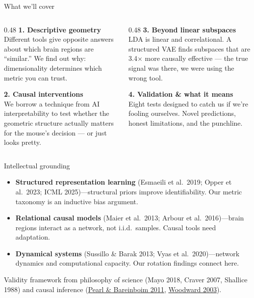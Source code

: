 \documentclass[aspectratio=169,11pt]{beamer}
\begin{document}
\begin{frame}{What we'll cover}
\begin{columns}[T]
\begin{column}{0.48\textwidth}
\textbf{1. Descriptive geometry}\\[0.2em]
{\small Different tools give opposite answers about which brain regions are ``similar.'' We find out why: dimensionality determines which metric you can trust.}

\vspace{0.6em}
\textbf{2. Causal interventions}\\[0.2em]
{\small We borrow a technique from AI interpretability to test whether the geometric structure actually matters for the mouse's decision --- or just looks pretty.}
\end{column}
\begin{column}{0.48\textwidth}
\textbf{3. Beyond linear subspaces}\\[0.2em]
{\small LDA is linear and correlational. A structured VAE finds subspaces that are 3.4$\times$ more causally effective --- the true signal was there, we were using the wrong tool.}

\vspace{0.6em}
\textbf{4. Validation \& what it means}\\[0.2em]
{\small Eight tests designed to catch us if we're fooling ourselves. Novel predictions, honest limitations, and the punchline.}
\end{column}
\end{columns}
\end{frame}

\begin{frame}{Intellectual grounding}
\begin{itemize}\setlength\itemsep{3pt}
  \item {\small \textbf{Structured representation learning} (Esmaeili et al.\ 2019; Opper et al.\ 2023; ICML 2025)---structural priors improve identifiability. Our metric taxonomy is an inductive bias argument.}
  \item {\small \textbf{Relational causal models} (Maier et al.\ 2013; Arbour et al.\ 2016)---brain regions interact as a network, not i.i.d.\ samples. Causal tools need adaptation.}
  \item {\small \textbf{Dynamical systems} (Sussillo \& Barak 2013; Vyas et al.\ 2020)---network dynamics and computational capacity. Our rotation findings connect here.}
\end{itemize}

\vspace{0.3em}
{\small Validity framework from philosophy of science (Mayo 2018, Craver 2007, Shallice 1988) and causal inference (\href{https://arxiv.org/abs/1203.3519}{Pearl \& Bareinboim 2011}, \href{https://doi.org/10.1093/0195155270.001.0001}{Woodward 2003}).}
\end{frame}
\end{document}
